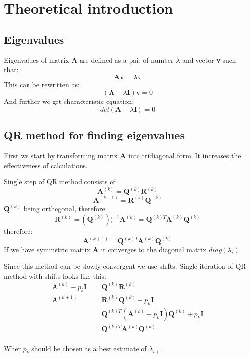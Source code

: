 \section{Theoretical introduction}
\subsection{Eigenvalues}
Eigenvalues of matrix \textbf{A} are defined as a pair of number $\lambda$ and vector \textbf{v} such that:
\[ \mathbf{A}\mathbf{v} = \lambda\mathbf{v} \]
This can be rewritten as:
\[ (\mathbf{A} - \lambda\mathbf{I})\mathbf{v} = 0 \]
And further we get characteristic equation:
\[ det(\mathbf{A} - \lambda\mathbf{I}) = 0 \]

\newpage
\subsection{QR method for finding eigenvalues}
First we start by transforming matrix \textbf{A} into tridiagonal form. It increases the effectiveness of calculations.

Single step of QR method consists of:
\[ \textbf{A}^{(k)} = \textbf{Q}^{(k)}\textbf{R}^{(k)} \]
\[ \textbf{A}^{(k+1)} = \textbf{R}^{(k)}\textbf{Q}^{(k)} \]
$\textbf{Q}^{(k)}$ being orthogonal, therefore:
\[ \textbf{R}^{(k)} = (\textbf{Q}^{(k)}))^{-1}\textbf{A}^{(k)} = \textbf{Q}^{(k)T}\textbf{A}^{(k)}\textbf{Q}^{(k)} \]
therefore:
\[ \textbf{A}^{(k+1)} = \textbf{Q}^{(k)T}\textbf{A}^{(k)}\textbf{Q}^{(k)} \]
If we have symmetric matrix \textbf{A} it converges to the diagonal matrix $diag(\lambda_i)$

Since this method can be slowly convergent we use shifts. Single iteration of QR method with shifts looks like this:
\begin{equation}
\begin{split}
\textbf{A}^{(k)} - p_k\textbf{I} &= \textbf{Q}^{(k)}\textbf{R}^{(k)} \\
\textbf{A}^{(k+1)} &= \textbf{R}^{(k)}\textbf{Q}^{(k)} + p_k\textbf{I} \\
&= \textbf{Q}^{(k)T}(\textbf{A}^{(k)} - p_k\textbf{I})\textbf{Q}^{(k)} + p_k\textbf{I} \\
&=\textbf{Q}^{(k)T}\textbf{A}^{(k)}\textbf{Q}^{(k)} \\
\end{split}
\end{equation}

Wher $p_k$ should be chosen as a best estimate of $\lambda_{i+1}$

\newpage
